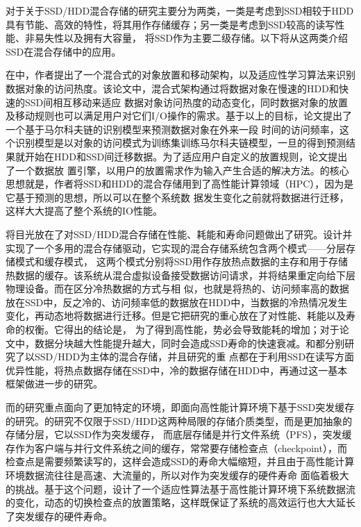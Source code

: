 对于关于SSD/HDD混合存储的研究主要分为两类，一类是考虑到SSD相较于HDD具有节能、高效的特性，将其用作存储缓存；另一类是考虑到SSD较高的读写性能、非易失性以及拥有大容量，
将SSD作为主要二级存储。以下将从这两类介绍SSD在混合存储中的应用。

在中，作者提出了一个混合式的对象放置和移动架构，以及适应性学习算法来识别数据对象的访问热度。该论文中，混合式架构通过将数据对象在慢速的HDD和快速的SSD间相互移动来适应
数据对象访问热度的动态变化，同时数据对象的放置及移动规则也可以满足用户对它们I/O操作的需求。基于以上的目标，论文提出了一个基于马尔科夫链的识别模型来预测数据对象在外来一段
时间的访问频率，这个识别模型是以对象的访问模式为训练集训练马尔科夫链模型，一旦的得到预测结果就开始在HDD和SSD间迁移数据。为了适应用户自定义的放置规则，论文提出了一个数据放
置引擎，以用户的放置需求作为输入产生合适的解决方法。的核心思想就是，作者将SSD和HDD的混合存储用到了高性能计算领域（HPC），因为是它基于预测的思想，所以可以在整个系统数
据发生变化之前就将数据进行迁移，这样大大提高了整个系统的IO性能。

将目光放在了对SSD/HDD混合存储在性能、耗能和寿命问题做出了研究。设计并实现了一个多用的混合存储驱动，它实现的混合存储系统包含两个模式——分层存储模式和缓存模式，
这两个模式分别将SSD用作存放热点数据的主存和用于存储热数据的缓存。该系统从混合虚拟设备接受数据访问请求，并将结果重定向给下层物理设备。而在区分冷热数据的方式与相
似，也就是将热的、访问频率高的数据放在SSD中，反之冷的、访问频率低的数据放在HDD中，当数据的冷热情况发生变化，再动态地将数据进行迁移。但是它把研究的重心放在了对性能、耗能以及寿命的权衡。它得出的结论是，
为了得到高性能，势必会导致能耗的增加；对于论文中，数据分块越大性能提升越大，同时会造成SSD寿命的快速衰减。和都分别研究了以SSD/HDD为主体的混合存储，并且研究的重
点都在于利用SSD在读写方面优异性能，将热点数据存储在SSD中，冷的数据存储在HDD中，再通过这一基本框架做进一步的研究。

而的研究重点面向了更加特定的环境，即面向高性能计算环境下基于SSD突发缓存的研究。的研究不仅限于SSD/HDD这两种局限的存储介质类型，而是更加抽象的存储分层，它以SSD作为突发缓存，
而底层存储是并行文件系统（PFS），突发缓存作为客户端与并行文件系统之间的缓存，常常要存储检查点（checkpoint），而检查点是需要频繁读写的，这样会造成SSD的寿命大幅缩短，并且由于高性能计算环境数据流往往是高速、大流量的，所以对作为突发缓存的硬件寿命
面临着极大的挑战。基于这个问题，设计了一个适应性算法基于高性能计算环境下系统数据流的变化，动态的切换检查点的放置策略，这样既保证了系统的高效运行也大大延长了突发缓存的硬件寿命。

